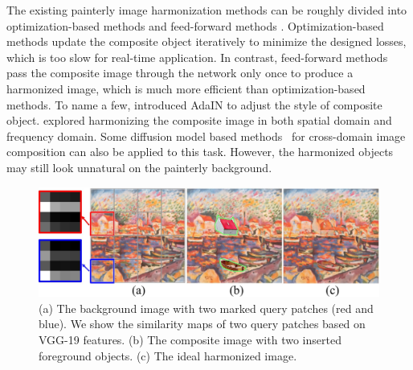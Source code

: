 \documentclass[letterpaper]{article} %
\begin{document}
The existing painterly image harmonization methods can be roughly divided into optimization-based methods \cite{luan2018deep,zhang2020deep} and feed-forward methods \cite{peng2019element,cao2022painterly,yan2022style}. Optimization-based methods update the composite object iteratively to minimize the designed losses, which is too slow for real-time application. In contrast, feed-forward methods pass the composite image through the network only once to produce a harmonized image, which is much more efficient than optimization-based methods. To name a few,
\cite{peng2019element} introduced AdaIN \cite{huang2017arbitrary} to adjust the style of composite object.  \cite{cao2022painterly} explored harmonizing the composite image in both spatial domain and frequency domain. Some diffusion model based methods~\cite{sdedit,cdc} for cross-domain image composition can also be applied to this task. However, the harmonized objects may still look unnatural on the painterly background.

\begin{figure}[t]
\centering
\includegraphics[width=1.0\linewidth]{figures/illustration.jpg}
\caption{(a) The background image with two marked query patches (red and blue). We show the similarity maps of two query patches based on VGG-19 \cite{VGG19} features. (b) The composite image with two inserted foreground objects. (c) The ideal harmonized image.}
\label{fig:illustration}
\end{figure}
\end{document}
